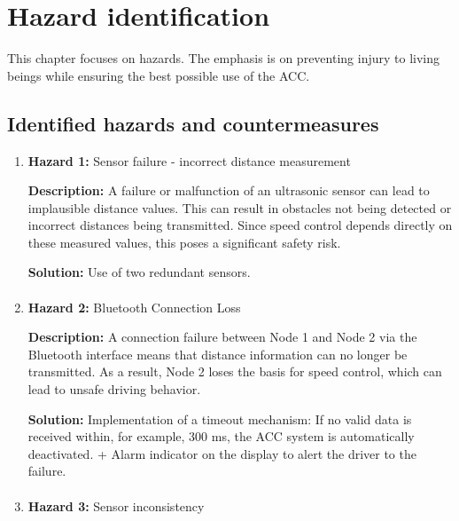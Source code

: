 \section{Hazard identification}
\label{chapter4}

This chapter focuses on hazards. The emphasis is on preventing injury to living beings while ensuring the best possible use of the ACC.

\subsection{Identified hazards and countermeasures}


	\begin{enumerate}
		\item \textbf{Hazard 1:} Sensor failure - incorrect distance measurement
            
            \textbf{Description:} A failure or malfunction of an ultrasonic sensor can lead to implausible distance values. This can result in obstacles not being detected or incorrect distances being transmitted. Since speed control depends directly on these measured values, this poses a significant safety risk.
            
            \textbf{Solution:} Use of two redundant sensors.

        \paragraph{}
		\item \textbf{Hazard 2:} Bluetooth Connection Loss
            
            \textbf{Description:} A connection failure between Node 1 and Node 2 via the Bluetooth interface means that distance information can no longer be transmitted. As a result, Node 2 loses the basis for speed control, which can lead to unsafe driving behavior.
            
            \textbf{Solution:} Implementation of a timeout mechanism: If no valid data is received within, for example, 300 ms, the ACC system is automatically deactivated. + Alarm indicator on the display to alert the driver to the failure.
        
        \paragraph{}
		\item \textbf{Hazard 3:} Sensor inconsistency
            

\end{enumerate}
